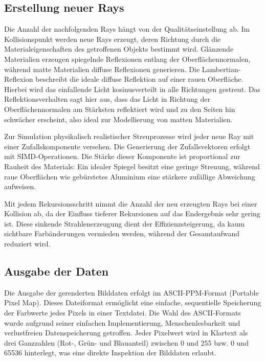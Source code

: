 \documentclass[sigconf]{acmart}
\begin{document}
\subsection{Erstellung neuer Rays} \label{ErstellungRays}
Die Anzahl der nachfolgenden Rays hängt von der Qualitätseinstellung ab.
Im Kollisionspunkt werden neue Rays erzeugt, deren Richtung durch die Materialeigenschaften des getroffenen Objekts bestimmt wird.
Glänzende Materialien erzeugen spiegelnde Reflexionen entlang der Oberflächennormalen, während matte Materialien diffuse Reflexionen generieren.
Die Lambertian-Reflexion beschreibt die ideale diffuse Reflektion auf einer rauen Oberfläche.
Hierbei wird das einfallende Licht kosinusverteilt in alle Richtungen gestreut.
Das Reflektionsverhalten sagt hier aus, dass das Licht in Richtung der Oberflächennormalen am Stärksten reflektiert wird und zu den Seiten hin schwächer erscheint, also ideal zur Modellierung von matten Materialien.

Zur Simulation physikalisch realistischer Streuprozesse wird jeder neue Ray mit einer Zufallskomponente versehen. Die Generierung der Zufallsvektoren erfolgt mit SIMD-Operationen.
Die Stärke dieser Komponente ist proportional zur Rauheit des Materials: Ein idealer Spiegel besitzt eine geringe Streuung, während raue Oberflächen wie gebürstetes Aluminium eine stärkere zufällige Abweichung aufweisen.

Mit jedem Rekursionsschritt nimmt die Anzahl der neu erzeugten Rays bei einer Kollision ab, da der Einfluss tieferer Rekursionen auf das Endergebnis sehr gering ist.
Diese sinkende Strahlenerzeugung dient der Effizienzsteigerung, da kaum sichtbare Farbänderungen vermieden werden, während der Gesamtaufwand reduziert wird.

\subsection{Ausgabe der Daten} \label{AusgabeDaten}
Die Ausgabe der gerenderten Bilddaten erfolgt im ASCII-PPM-Format (Portable Pixel Map).
Dieses Dateiformat ermöglicht eine einfache, sequentielle Speicherung der Farbwerte jedes Pixels in einer Textdatei.
Die Wahl des ASCII-Formats wurde aufgrund seiner einfachen Implementierung, Menschenlesbarkeit und verlustfreien Datenspeicherung getroffen.
Jeder Pixelwert wird in Klartext als drei Ganzzahlen (Rot-, Grün- und Blauanteil) zwischen 0 und 255 bzw. 0 und 65536 hinterlegt, was eine direkte Inspektion der Bilddaten erlaubt.
\end{document}
